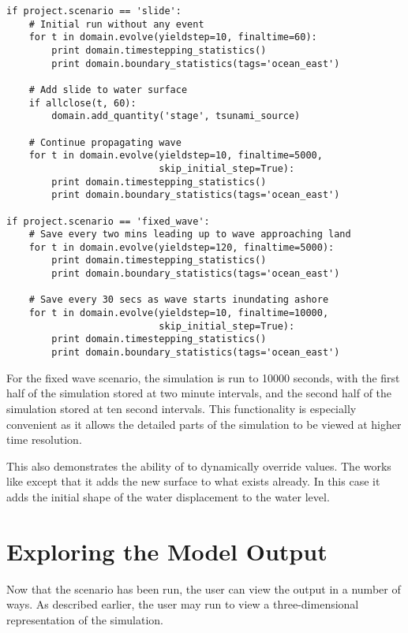 \documentclass{manual}
\begin{document}
\begin{verbatim}
if project.scenario == 'slide':
    # Initial run without any event
    for t in domain.evolve(yieldstep=10, finaltime=60):
        print domain.timestepping_statistics()
        print domain.boundary_statistics(tags='ocean_east')

    # Add slide to water surface
    if allclose(t, 60):
        domain.add_quantity('stage', tsunami_source)

    # Continue propagating wave
    for t in domain.evolve(yieldstep=10, finaltime=5000,
                           skip_initial_step=True):
        print domain.timestepping_statistics()
        print domain.boundary_statistics(tags='ocean_east')

if project.scenario == 'fixed_wave':
    # Save every two mins leading up to wave approaching land
    for t in domain.evolve(yieldstep=120, finaltime=5000):
        print domain.timestepping_statistics()
        print domain.boundary_statistics(tags='ocean_east')

    # Save every 30 secs as wave starts inundating ashore
    for t in domain.evolve(yieldstep=10, finaltime=10000,
                           skip_initial_step=True):
        print domain.timestepping_statistics()
        print domain.boundary_statistics(tags='ocean_east')
\end{verbatim}

For the fixed wave scenario, the simulation is run to 10000 seconds,
with the first half of the simulation stored at two minute intervals,
and the second half of the simulation stored at ten second intervals.
This functionality is especially convenient as it allows the detailed
parts of the simulation to be viewed at higher time resolution.

This also demonstrates the ability of \anuga to dynamically override values.  The
 works like  except that it adds the new
surface to what exists already.  In this case it adds the initial shape of the water
displacement to the water level.

\section{Exploring the Model Output}

Now that the scenario has been run, the user can view the output in a number of ways.
As described earlier, the user may run  to view a three-dimensional representation
of the simulation.
\end{document}
